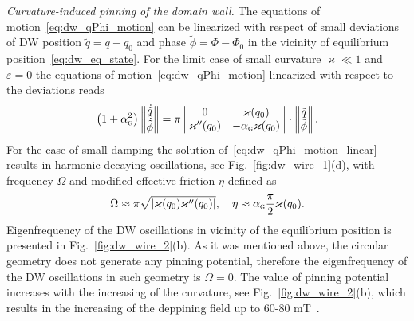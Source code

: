 {\it Curvature-induced pinning of the domain wall.} The equations of motion~\eqref{eq:dw_qPhi_motion} can be linearized with respect of small deviations of DW position $\tilde{q}=q-q_0$ and phase $\tilde{\phi}=\Phi-\Phi_0$ in the vicinity of equilibrium position~\eqref{eq:dw_eq_state}. For the limit case of small curvature $\varkappa\ll1$ and $\varepsilon=0$ the equations of motion~\eqref{eq:dw_qPhi_motion} linearized with respect to the deviations reads~\cite{Yershov15b}
\begin{equation}\label{eq:dw_qPhi_motion_linear}
\left(1+\alpha_\textsc{g}^2\right)\left\|\begin{matrix}
\dot{\tilde{q}}\\
\dot{\tilde{\phi}}
\end{matrix}\right\|=\pi\left\|\begin{matrix}
0 & \varkappa(q_0)\\
\varkappa''(q_0)&-\alpha_\textsc{g}\varkappa(q_0)
\end{matrix}\right\|\cdot\left\|\begin{matrix}
\tilde{q}\\
\tilde{\phi}
\end{matrix}\right\|.
\end{equation}
For the case of small damping the solution of~\eqref{eq:dw_qPhi_motion_linear} results in harmonic decaying oscillations, see Fig.~\ref{fig:dw_wire_1}(d), with frequency $\Omega$ and modified effective friction $\eta$ defined as
\begin{equation}
\Omega \approx \pi\sqrt{|\varkappa(q_0)\varkappa''(q_0)|},\quad \eta\approx \alpha_\textsc{g}\frac{\pi}{2}\varkappa(q_0).
\end{equation}
Eigenfrequency of the DW oscillations in vicinity of the equilibrium position is presented in Fig.~\ref{fig:dw_wire_2}(b). As it was mentioned above, the circular geometry does not generate any pinning potential, therefore the eigenfrequency of the DW oscillations in such geometry is $\Omega=0$. The value of pinning potential increases with the increasing of the curvature, see Fig.~\ref{fig:dw_wire_2}(b), which results in the increasing of the deppining field up to 60-80 mT~\cite{Volkov19c,Lewis09}.

